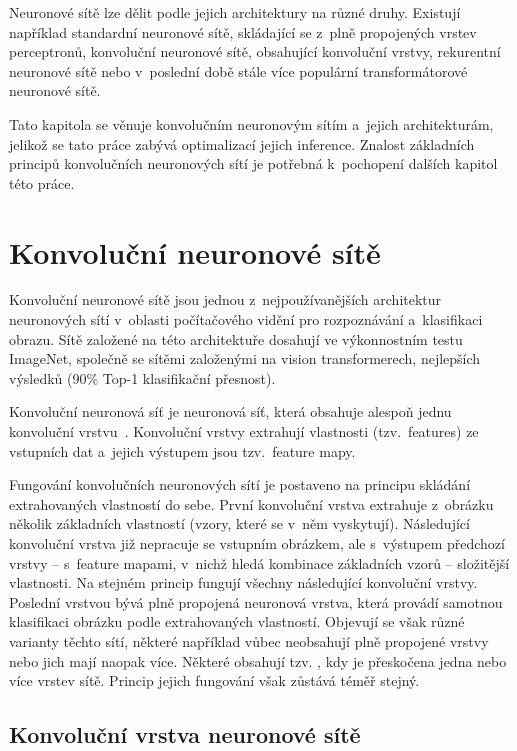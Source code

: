 Neuronové sítě lze dělit podle jejich architektury na různé druhy. Existují například standardní neuronové sítě, skládající se z~plně propojených vrstev perceptronů, konvoluční neuronové sítě, obsahující konvoluční vrstvy, rekurentní neuronové sítě nebo v~poslední době stále více populární transformátorové neuronové sítě.

Tato kapitola se věnuje konvolučním neuronovým sítím a~jejich architekturám, jelikož se tato práce zabývá optimalizací jejich inference. Znalost základních principů konvolučních neuronových sítí je potřebná k~pochopení dalších kapitol této práce.

\section{Konvoluční neuronové sítě}
Konvoluční neuronové sítě jsou jednou z~nejpoužívanějších architektur neuronových sítí v~oblasti počítačového vidění pro rozpoznávání a~klasifikaci obrazu. Sítě založené na této architektuře dosahují ve výkonnostním testu ImageNet, společně se sítěmi založenými na vision transformerech, nejlepších výsledků ($90\%$ Top-1 klasifikační přesnost).

Konvoluční neuronová síť je neuronová síť, která obsahuje alespoň jednu konvoluční vrstvu~\cite{Skansi2018-as}. Konvoluční vrstvy extrahují vlastnosti (tzv.~features) ze vstupních dat a~jejich výstupem jsou tzv.~feature mapy. 

Fungování konvolučních neuronových sítí je postaveno na principu skládání extrahovaných vlastností do sebe. První konvoluční vrstva extrahuje z~obrázku několik základních vlastností (vzory, které se v~něm vyskytují). Následující konvoluční vrstva již nepracuje se vstupním obrázkem, ale s~výstupem předchozí vrstvy -- s~feature mapami, v~nichž hledá kombinace základních vzorů -- složitější vlastnosti. Na stejném princip fungují všechny následující konvoluční vrstvy. Poslední vrstvou bývá plně propojená neuronová vrstva, která provádí samotnou klasifikaci obrázku podle extrahovaných vlastností. Objevují se však různé varianty těchto sítí, některé například vůbec neobsahují plně propojené vrstvy nebo jich mají naopak více. Některé obsahují tzv. , kdy je přeskočena jedna nebo více vrstev sítě. Princip jejich fungování však zůstává téměř stejný.

\subsection{Konvoluční vrstva neuronové sítě}
\label{subsection:convlayer}

